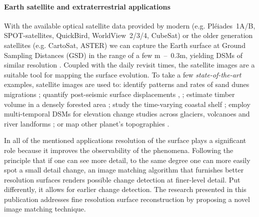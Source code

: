 \documentclass[journal]{IEEEtran}
\begin{document}

 

\paragraph{Earth satellite and extraterrestrial applications}
With the available optical satellite data provided by modern (e.g. Pl\'eiades~1A/B, SPOT-satellites, QuickBird, WorldView~2/3/4, CubeSat) or the older generation satellites (e.g. CartoSat, ASTER) we can capture the Earth surface at Ground Sampling Distances (GSD) in the range of a few m~--~0.3m, yielding DSMs of similar resolution \cite{rupnik:17:fusion}. Coupled with the daily revisit times, the satellite images are a suitable tool for mapping the surface evolution. To take a few \textit{state-of-the-art} examples, satellite images are used to: identify patterns and rates of sand dunes migrations \cite{hermas2012retrieving}; quantify post-seismic surface displacements \cite{rosu2015measurement}, \cite{vallage2015inelastic}; estimate timber volume in a densely forested area \cite{straub2013assessment}; study the time-varying coastal shelf \cite{tseng2017reconstruction}; employ multi-temporal DSMs for elevation change studies across glaciers, volcanoes and river landforms \cite{girod2017mmaster}; or map other planet's topographies \cite{gwinner2010topography}.\par 
%
In all of the mentioned applications resolution of the surface plays a significant role because it improves the observability of the phenomena. Following the principle that if one can see more detail, to the same degree one can more easily spot a small detail change, an image matching algorithm that furnishes better  resolution surfaces renders possible change detection at finer-level detail. Put differently, it allows for earlier change detection. The research presented in this publication addresses fine resolution surface reconstruction by proposing a novel image matching technique. 


 
\end{document}
